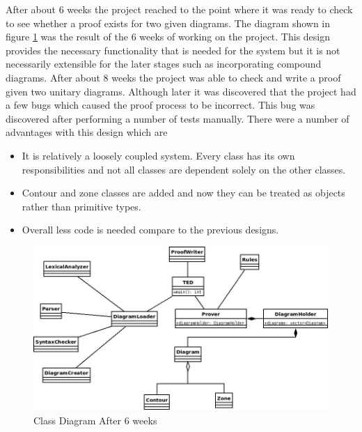 \documentclass[10pt, a4paper, titlepage]{article}
\begin{document}
After about 6 weeks the project reached to the point where it was ready to check to see whether a proof exists for two given diagrams. The diagram shown in figure \ref{5th} was the result of the 6 weeks of working on the project. This design provides the necessary functionality that is needed for the system but it is not necessarily extensible for the later stages such as  incorporating compound diagrams. After about 8 weeks the project was able to check and write a proof given two unitary diagrams. Although later it was discovered that the project had a few bugs which caused the proof process to be incorrect. This bug was discovered after performing a number of tests manually. There were a number of advantages with this design which are

\begin{itemize}
\item It is relatively a loosely coupled system. Every class has its own responsibilities and not all classes are dependent solely on the other classes.
\item Contour and zone classes are added and now they can be treated as objects rather than primitive types.
\item Overall less code is needed compare to the previous designs.
\end{itemize}

\begin{figure}[h]
\centering
\includegraphics[scale=0.5]{images/5th.jpeg}
\caption{Class Diagram After 6 weeks}
\label{5th}
\end{figure}
\end{document}
